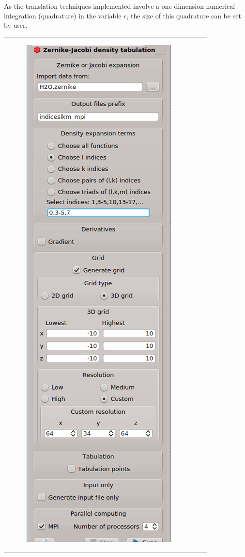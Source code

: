 \documentclass[10pt]{article}
\begin{document}
As the translation techniques implemented involve a one-dimension numerical integration
(quadrature) in the variable $r$, the size of this quadrature can be set by user.

\begin{tabular}{lcr}
\begin{minipage}{.3\linewidth}
\begin{figure}[H]
\begin{center}
\vspace*{0mm}
\includegraphics[width=.7\linewidth]{damqt_fig_2_14_2.png}

\end{center}
\end{figure}
\end{minipage}
\end{tabular}
\end{document}
